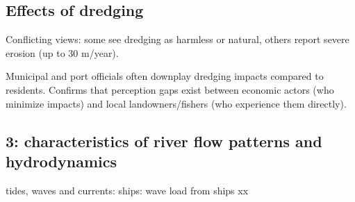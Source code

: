 \subsection{Effects of dredging}
Conflicting views: some see dredging as harmless or natural, others report severe erosion (up to 30 m/year).

Municipal and port officials often downplay dredging impacts compared to residents.
Confirms that perception gaps exist between economic actors (who minimize impacts) and local landowners/fishers (who experience them directly).

\subsection{3: characteristics of river flow patterns and hydrodynamics}
tides, waves and currents: 
ships: wave load from ships xx



